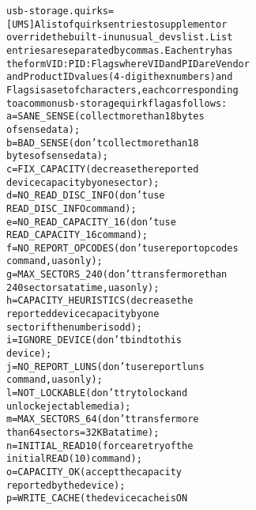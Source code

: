 \documentclass[a4paper,8pt,english]{sphinxmanual}
\begin{document}
\begin{alltt}
        usb-storage.quirks=
                        {[}UMS{]} A list of quirks entries to supplement or
                        override the built-in unusual\_devs list.  List
                        entries are separated by commas.  Each entry has
                        the form VID:PID:Flags where VID and PID are Vendor
                        and Product ID values (4-digit hex numbers) and
                        Flags is a set of characters, each corresponding
                        to a common usb-storage quirk flag as follows:
                                a = SANE\_SENSE (collect more than 18 bytes
                                        of sense data);
                                b = BAD\_SENSE (don't collect more than 18
                                        bytes of sense data);
                                c = FIX\_CAPACITY (decrease the reported
                                        device capacity by one sector);
                                d = NO\_READ\_DISC\_INFO (don't use
                                        READ\_DISC\_INFO command);
                                e = NO\_READ\_CAPACITY\_16 (don't use
                                        READ\_CAPACITY\_16 command);
                                f = NO\_REPORT\_OPCODES (don't use report opcodes
                                        command, uas only);
                                g = MAX\_SECTORS\_240 (don't transfer more than
                                        240 sectors at a time, uas only);
                                h = CAPACITY\_HEURISTICS (decrease the
                                        reported device capacity by one
                                        sector if the number is odd);
                                i = IGNORE\_DEVICE (don't bind to this
                                        device);
                                j = NO\_REPORT\_LUNS (don't use report luns
                                        command, uas only);
                                l = NOT\_LOCKABLE (don't try to lock and
                                        unlock ejectable media);
                                m = MAX\_SECTORS\_64 (don't transfer more
                                        than 64 sectors = 32 KB at a time);
                                n = INITIAL\_READ10 (force a retry of the
                                        initial READ(10) command);
                                o = CAPACITY\_OK (accept the capacity
                                        reported by the device);
                                p = WRITE\_CACHE (the device cache is ON

\end{alltt}
\end{document}
